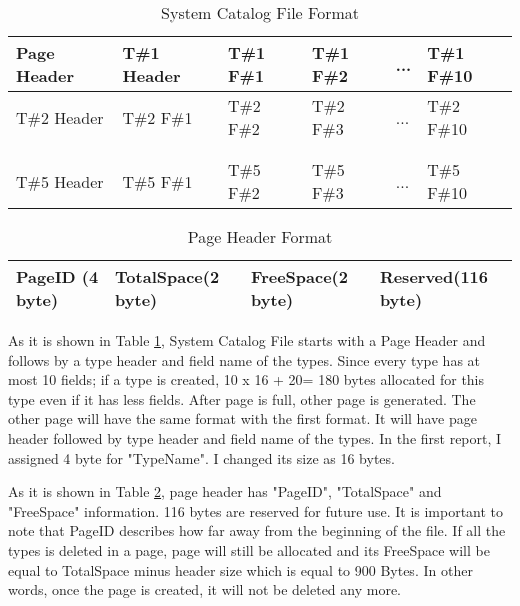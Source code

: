 \documentclass[12pt]{article}
\begin{document}
\begin{table}[H]
\centering
\caption{System Catalog File Format}
\label{System Catalog File Format}
\begin{tabular}{ | l | l | l | l | l | l |}
\hline
 Page Header & T\#1 Header & T\#1 F\#1 & T\#1 F\#2 & ... & T\#1 F\#10 \\
\hline
 T\#2 Header & T\#2 F\#1 & T\#2 F\#2 & T\#2 F\#3 & ... & T\#2 F\#10 \\
\hline
 &  &  &  &  & \\
\hline
 &  &  &  &  & \\
\hline 
 T\#5 Header & T\#5 F\#1 & T\#5 F\#2 & T\#5 F\#3 & ... & T\#5 F\#10 \\
\hline 
\end{tabular}
\end{table}

\begin{table}[H]
\centering
\caption{Page Header Format}
\label{Page Header Format}
\begin{tabular}{ | l | l | l | l |}
\hline
 PageID (4 byte) & TotalSpace(2 byte) & FreeSpace(2 byte) & Reserved(116 byte) \\
\hline
\end{tabular}
\end{table}

\begin{table}[H]
\centering
\caption{Type Header Format}
\label{Type Header Format}
\end{table}


As it is shown in Table \ref{System Catalog File Format}, System Catalog File starts with a Page Header and follows by a type header and field name of the types. Since every type has at most 10 fields; if a type is created, 10 x 16 + 20= 180 bytes allocated for this type even if it has less fields. After page is full, other page is generated. The other page will have the same format with the first format. It will have page header followed by type header and field name of the types. In the first report, I assigned 4 byte for "TypeName". I changed its size as 16 bytes.

As it is shown in Table \ref{Page Header Format}, page header has "PageID", "TotalSpace" and "FreeSpace" information. 116 bytes are reserved for future use. It is important to note that PageID describes how far away from the beginning of the file. If all the types is deleted in a page, page will still be allocated and its FreeSpace will be equal to TotalSpace minus header size which is equal to 900 Bytes. In other words, once the page is created, it will not be deleted any more.
\end{document}
